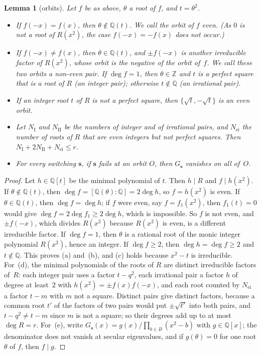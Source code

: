 \documentclass[11pt]{article}
\numberwithin{equation}{section}
\newtheorem{lemma}{Lemma}[section]
\theoremstyle{remark}
\newcommand{\Q}{\mathbb Q}
\newcommand{\Z}{\mathbb Z}
\newcommand{\s}{\mathbf s}
\newcommand{\NI}{N_{\mathrm I}}
\newcommand{\NII}{N_{\mathrm{II}}}
\newcommand{\Nei}{N_{\mathrm{ei}}}
\begin{document}
\begin{lemma}[orbits]\label{lem:orbits}
Let $f$ be as above, $\theta$ a root of $f$, and $t=\theta^2$.
\begin{itemize}
\item[(a)] If $f(-x)=f(x)$, then $\theta\notin\Q(t)$. We call the orbit of
 $f$ \emph{even}. (As $0$ is not a root of $R(x^2)$, the case $f(-x)=-f(x)$
 does not occur.)
\item[(b)] If $f(-x)\ne f(x)$, then $\theta\in\Q(t)$, and $\pm f(-x)$ is another
 irreducible factor of $R(x^2)$, whose orbit is the negative of the orbit of~$f$. We call
 these two orbits a \emph{non-even pair}. If $\deg f=1$, then $\theta\in\Z$ and
 $t$ is a perfect square that is a root of $R$ (an \emph{integer pair});
 otherwise $t\notin\Q$ (an \emph{irrational pair}).
\item[(c)] If an integer root $t$ of $R$ is not a perfect square, then
 $\{\sqrt t,-\sqrt t\}$ is an even orbit.
\item[(d)] Let $\NI$ and $\NII$ be the numbers of integer and of irrational
 pairs, and $\Nei$ the number of roots of $R$ that are even integers but not
 perfect squares. Then $\NI+2\NII+\Nei\le r$.
\item[(e)] For every switching $\s$, if $\s$ fails at an orbit $O$, then
 $G_{\s}$ vanishes on all of~$O$.
\end{itemize}
\end{lemma}
\begin{proof}
Let $h\in\Q[t]$ be the minimal polynomial of $t$. Then $h\mid R$ and
$f\mid h(x^2)$. If $\theta\notin\Q(t)$, then
$\deg f=[\Q(\theta):\Q]=2\deg h$, so $f=h(x^2)$ is even. If $\theta\in\Q(t)$,
then $\deg f=\deg h$; if $f$ were even, say $f=f_1(x^2)$, then $f_1(t)=0$ would
give $\deg f=2\deg f_1\ge2\deg h$, which is impossible. So $f$ is not even, and
$\pm f(-x)$, which divides $R(x^2)$ because $R(x^2)$ is even, is a different
irreducible factor. If $\deg f=1$, then $\theta$ is a rational root of the
monic integer polynomial $R(x^2)$, hence an integer. If $\deg f\ge2$, then
$\deg h=\deg f\ge2$ and $t\notin\Q$. This proves (a) and~(b), and (c) holds
because $x^2-t$ is irreducible. For~(d), the minimal polynomials of the roots
of $R$ are distinct irreducible factors of~$R$: each integer pair uses a factor
$t-q^2$, each irrational pair a factor $h$ of degree at least~$2$ with
$h(x^2)=\pm f(x)f(-x)$, and each root counted by $\Nei$ a factor $t-m$ with $m$
not a square. Distinct pairs give distinct factors, because a common root $t'$
of the factors of two pairs would put $\pm\sqrt{t'}$ into both pairs, and
$t-q^2\ne t-m$ since $m$ is not a square; so their degrees add up to at most
$\deg R=r$. For~(e), write $G_{\s}(x)=g(x)/\prod_{b\in B}(x^2-b)$ with
$g\in\Q[x]$; the denominator does not vanish at secular eigenvalues, and if
$g(\theta)=0$ for one root $\theta$ of $f$, then $f\mid g$.
\end{proof}
\end{document}
